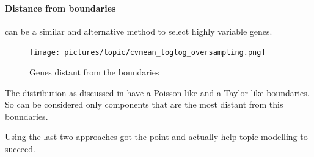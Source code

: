 \paragraph{Distance from boundaries} can be a similar and alternative method to select highly variable genes.
\begin{figure}[htb!]
    \centering
    \texttt{[image: pictures/topic/cvmean\_loglog\_oversampling.png]}
    \caption{Genes distant from the boundaries}
    \label{fig:topic/cvmean_oversampling}
\end{figure}
The distribution as discussed in  have a Poisson-like and a Taylor-like boundaries. So can be considered only components that are the most distant from this boundaries.

Using the last two approaches got the point and actually help topic modelling to succeed.